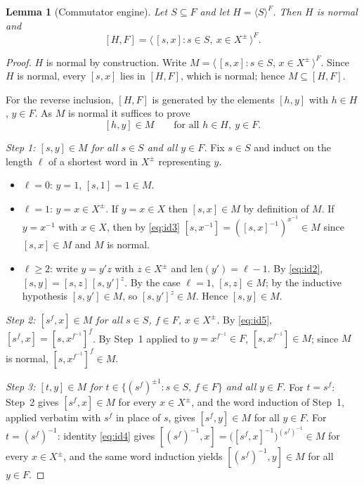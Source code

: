 \documentclass{amsart}
\newtheorem{lemma}{Lemma}
\theoremstyle{definition}
\theoremstyle{remark}
\begin{document}
\begin{lemma}[Commutator engine]\label{lem:engine}
Let $S\subseteq F$ and let $H=\langle S\rangle^{F}$. Then $H$ is normal and
\begin{equation}\label{eq:engine}
[H,F]=\big\langle\,[s,x] : s\in S,\ x\in X^{\pm}\,\big\rangle^{F}.
\end{equation}
\end{lemma}

\begin{proof}
$H$ is normal by construction. Write
$M=\langle\,[s,x]:s\in S,\,x\in X^{\pm}\,\rangle^{F}$. Since $H$ is normal, every
$[s,x]$ lies in $[H,F]$, which is normal; hence $M\subseteq[H,F]$.

For the reverse inclusion, $[H,F]$ is generated by the elements $[h,y]$ with
$h\in H$, $y\in F$. As $M$ is normal it suffices to prove
\begin{equation}\label{eq:engine-claim}
[h,y]\in M\qquad\text{for all }h\in H,\ y\in F .
\end{equation}

\smallskip
\emph{Step 1: $[s,y]\in M$ for all $s\in S$ and all $y\in F$.}
Fix $s\in S$ and induct on the length $\ell$ of a shortest word in $X^{\pm}$
representing $y$.
\begin{itemize}
\item $\ell=0$: $y=1$, $[s,1]=1\in M$.
\item $\ell=1$: $y=x\in X^{\pm}$. If $y=x\in X$ then $[s,x]\in M$ by definition of
$M$. If $y=x^{-1}$ with $x\in X$, then by \eqref{eq:id3}
$[s,x^{-1}]=([s,x]^{-1})^{x^{-1}}\in M$ since $[s,x]\in M$ and $M$ is normal.
\item $\ell\ge2$: write $y=y'z$ with $z\in X^{\pm}$ and $\mathrm{len}(y')=\ell-1$.
By \eqref{eq:id2}, $[s,y]=[s,z]\,[s,y']^{z}$. By the case $\ell=1$, $[s,z]\in M$;
by the inductive hypothesis $[s,y']\in M$, so $[s,y']^{z}\in M$. Hence
$[s,y]\in M$.
\end{itemize}

\smallskip
\emph{Step 2: $[s^{f},x]\in M$ for all $s\in S$, $f\in F$, $x\in X^{\pm}$.}
By \eqref{eq:id5}, $[s^{f},x]=[s,x^{f^{-1}}]^{f}$. By Step~1 applied to
$y=x^{f^{-1}}\in F$, $[s,x^{f^{-1}}]\in M$; since $M$ is normal,
$[s,x^{f^{-1}}]^{f}\in M$.

\smallskip
\emph{Step 3: $[t,y]\in M$ for $t\in\{(s^{f})^{\pm1}:s\in S,\,f\in F\}$ and all
$y\in F$.}
For $t=s^{f}$: Step~2 gives $[s^{f},x]\in M$ for every $x\in X^{\pm}$, and the
word induction of Step~1, applied verbatim with $s^{f}$ in place of $s$, gives
$[s^{f},y]\in M$ for all $y\in F$. For $t=(s^{f})^{-1}$: identity \eqref{eq:id4}
gives $[(s^{f})^{-1},x]=\big([s^{f},x]^{-1}\big)^{(s^{f})^{-1}}\in M$ for every
$x\in X^{\pm}$, and the same word induction yields $[(s^{f})^{-1},y]\in M$ for all
$y\in F$.


\end{proof}
\end{document}
